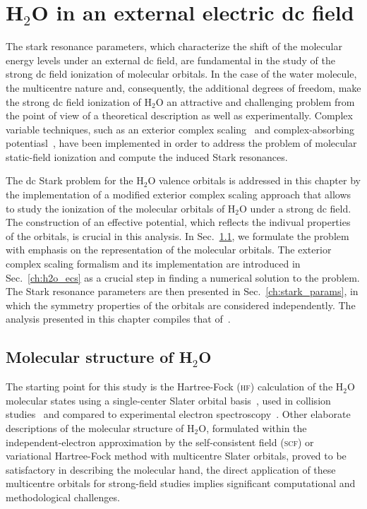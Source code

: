 \chapter{H$_{2}$O in an external electric dc field}
\label{cha:dc_h2o}


The stark resonance parameters, which characterize the shift of the
molecular energy levels under an external dc field, are fundamental in
the study of the strong dc field ionization of molecular orbitals. In
the case of the water molecule, the multicentre nature and,
consequently, the additional degrees of freedom, make the strong dc
field ionization of H$_{2}$O an attractive and challenging problem
from the point of view of a theoretical description as well as
experimentally. Complex variable techniques, such as an exterior
complex scaling~\cite{Simon_1979,Scrinzi_2010} and complex-absorbing
potentiasl~\cite{RissMeyer_1993,Krause_2014}, have been implemented in
order to address the problem of molecular static-field ionization and
compute the induced Stark resonances.

The dc Stark problem for the H$_{2}$O valence orbitals is addressed in
this chapter by the implementation of a modified exterior complex
scaling approach that allows to study the ionization of the molecular
orbitals of H$_{2}$O under a strong dc field. The construction of an
effective potential, which reflects the indivual properties of the
orbitals, is crucial in this analysis. In Sec.~\ref{ch:h2o_structure},
we formulate the problem with emphasis on the representation of the
molecular orbitals. The exterior complex scaling formalism and its
implementation are introduced in Sec.~\ref{ch:h2o_ecs} as a crucial
step in finding a numerical solution to the problem. The Stark
resonance parameters are then presented in Sec.~\ref{ch:stark_params},
in which the symmetry properties of the orbitals are considered
independently. The analysis presented in this chapter compiles that
of~\cite{sarias_2016,sarias_2017}.


\section{Molecular structure of H$_{2}$O}
\label{ch:h2o_structure}

The starting point for this study is the Hartree-Fock (\textsc{hf})
calculation of the H$_{2}$O molecular states using a single-center
Slater orbital
basis~\cite{Moccia_1964,Moccia_JCP_2164,Moccia_JCP_2176}, used in
collision studies~\cite{Montanari_2013} and compared to experimental
electron spectroscopy~\cite{Hafied_2007}. Other elaborate descriptions
of the molecular structure of H$_{2}$O, formulated within the
independent-electron approximation by the self-consistent field
(\textsc{scf}) or variational Hartree-Fock method with multicentre
Slater orbitals, proved to be satisfactory in describing the molecular
hand, the direct application of these multicentre orbitals for
strong-field studies implies significant computational and
methodological challenges.



